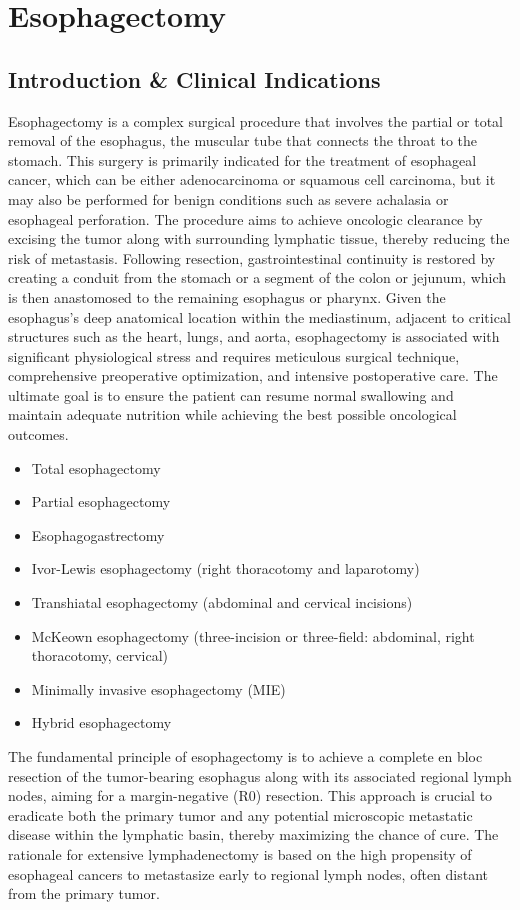 \chapter{Esophagectomy}

\section*{Introduction \& Clinical Indications}
Esophagectomy is a complex surgical procedure that involves the partial or total removal of the esophagus, the muscular tube that connects the throat to the stomach. This surgery is primarily indicated for the treatment of esophageal cancer, which can be either adenocarcinoma or squamous cell carcinoma, but it may also be performed for benign conditions such as severe achalasia or esophageal perforation. The procedure aims to achieve oncologic clearance by excising the tumor along with surrounding lymphatic tissue, thereby reducing the risk of metastasis. Following resection, gastrointestinal continuity is restored by creating a conduit from the stomach or a segment of the colon or jejunum, which is then anastomosed to the remaining esophagus or pharynx. Given the esophagus's deep anatomical location within the mediastinum, adjacent to critical structures such as the heart, lungs, and aorta, esophagectomy is associated with significant physiological stress and requires meticulous surgical technique, comprehensive preoperative optimization, and intensive postoperative care. The ultimate goal is to ensure the patient can resume normal swallowing and maintain adequate nutrition while achieving the best possible oncological outcomes.

\begin{itemize}
  \item Total esophagectomy
  \item Partial esophagectomy
  \item Esophagogastrectomy
  \item Ivor-Lewis esophagectomy (right thoracotomy and laparotomy)
  \item Transhiatal esophagectomy (abdominal and cervical incisions)
  \item McKeown esophagectomy (three-incision or three-field: abdominal, right thoracotomy, cervical)
  \item Minimally invasive esophagectomy (MIE)
  \item Hybrid esophagectomy
\end{itemize}

The fundamental principle of esophagectomy is to achieve a complete en bloc resection of the tumor-bearing esophagus along with its associated regional lymph nodes, aiming for a margin-negative (R0) resection. This approach is crucial to eradicate both the primary tumor and any potential microscopic metastatic disease within the lymphatic basin, thereby maximizing the chance of cure. The rationale for extensive lymphadenectomy is based on the high propensity of esophageal cancers to metastasize early to regional lymph nodes, often distant from the primary tumor.


